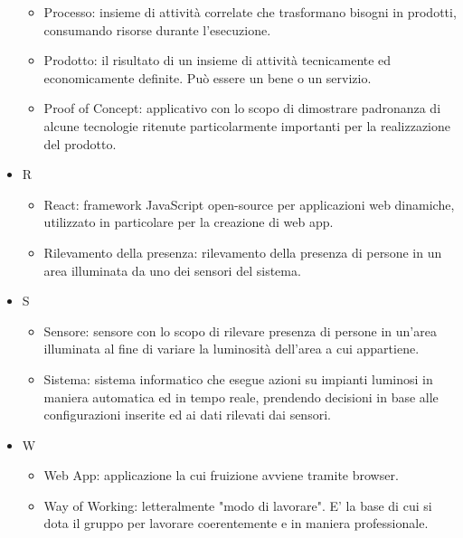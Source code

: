 \documentclass[12pt]{article}
\begin{document}
\begin{itemize}
\begin{itemize}
        \item Processo: insieme di attività correlate che trasformano bisogni in prodotti, consumando risorse durante l'esecuzione.
        \item Prodotto: il risultato di un insieme di attività tecnicamente ed economicamente definite. Può essere un bene o un servizio.
        \item Proof of Concept: applicativo con lo scopo di dimostrare padronanza di alcune tecnologie ritenute particolarmente importanti per la realizzazione del prodotto.
    \end{itemize}
    \item[] R
    \begin{itemize}
        \item React: framework JavaScript open-source per applicazioni web dinamiche, utilizzato in particolare per la creazione di web app.
        \item Rilevamento della presenza: rilevamento della presenza di persone in un area illuminata da uno dei sensori del sistema.
    \end{itemize}
    \item[] S
    \begin{itemize}
        \item Sensore: sensore con lo scopo di rilevare presenza di persone in un’area illuminata al fine di variare la luminosità dell’area a cui appartiene.
        \item Sistema: sistema informatico che esegue azioni su impianti luminosi in maniera automatica ed in tempo reale, prendendo decisioni in base alle configurazioni inserite ed ai dati rilevati dai sensori.
    \end{itemize}
    \item[] W
    \begin{itemize}
        \item Web App: applicazione la cui fruizione avviene tramite browser.
        \item Way of Working: letteralmente "modo di lavorare". E' la base di cui si dota il gruppo per lavorare coerentemente e in maniera professionale.
    \end{itemize}    
\end{itemize}
\end{document}

